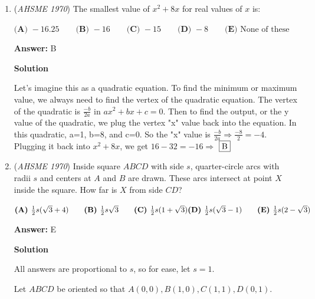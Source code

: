 \begin{enumerate}
 $\textbf{(A) }1+i\qquad \textbf{(B) }1\qquad \textbf{(C) }-1\qquad \textbf{(D) }0\qquad  \textbf{(E) }-1-i$

 \textbf{Answer: }D



\textbf{Solution}

$i^4 = 1$ and $i^2=-1$, so the numerator is $0$. As long as the denominator is not $0$, which it isn't, the answer is $0 \Rightarrow$ $\fbox{D}$



	\item (\textit{AHSME 1970}) The smallest value of $x^2+8x$ for real values of $x$ is:


 $\textbf{(A) }-16.25\qquad \textbf{(B) }-16\qquad \textbf{(C) }-15\qquad \textbf{(D) }-8\qquad  \textbf{(E) }\text{None of these}$

 \textbf{Answer: }B



\textbf{Solution}

Let's imagine this as a quadratic equation. To find the minimum or maximum value, we always need to find the vertex of the quadratic equation. The vertex of the quadratic is $\frac{-b}{2a}$ in $ax^2+bx+c=0$. Then to find the output, or the y value of the quadratic, we plug the vertex "x" value back into the equation. In this quadratic, a=1, b=8, and c=0. So the "x" value is $\frac{-b}{2a} \Rightarrow \frac{-8}{2} = -4$. Plugging it back into $x^2 + 8x$, we get $16-32 = -16 \Rightarrow$ $\fbox{B}$



	\item (\textit{AHSME 1970}) Inside square $ABCD$ with side $s$, quarter-circle arcs with radii $s$ and centers at $A$ and $B$ are drawn. 
These arcs intersect at point $X$ inside the square. How far is $X$ from side $CD$?


 $\textbf{(A) }\frac{1}{2}s(\sqrt{3}+4)\qquad \textbf{(B) }\frac{1}{2}s\sqrt{3}\qquad \textbf{(C) }\frac{1}{2}s(1+\sqrt{3})\qquad\\ \textbf{(D) }\frac{1}{2}s(\sqrt{3}-1)\qquad  \textbf{(E) }\frac{1}{2}s(2-\sqrt{3})$

 \textbf{Answer: }E



\textbf{Solution}

All answers are proportional to $s$, so for ease, let $s=1$.

 Let $ABCD$ be oriented so that $A(0, 0), B(1, 0), C(1, 1), D(0, 1)$.


\end{enumerate}
